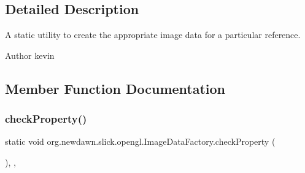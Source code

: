 \subsection{Detailed Description}
A static utility to create the appropriate image data for a particular reference.

\begin{DoxyAuthor}{Author}
kevin 
\end{DoxyAuthor}


\subsection{Member Function Documentation}
\mbox{\label{classorg_1_1newdawn_1_1slick_1_1opengl_1_1_image_data_factory_a20a3a399bfd4d8bc15a488e3358a3bf4}} 
\subsubsection{\texorpdfstring{check\+Property()}{checkProperty()}}
{\footnotesize\ttfamily static void org.\+newdawn.\+slick.\+opengl.\+Image\+Data\+Factory.\+check\+Property (\begin{DoxyParamCaption}{ }\end{DoxyParamCaption})\hspace{0.3cm}{\ttfamily [inline]}, {\ttfamily [static]}, {\ttfamily [private]}}

